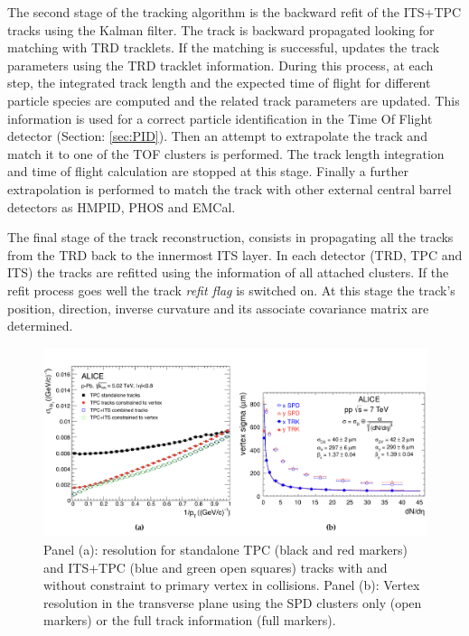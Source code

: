 The second stage of the tracking algorithm is the backward refit of the ITS+TPC tracks using the
Kalman filter.
The track is backward propagated looking for matching with TRD tracklets. If the matching is
successful, updates the track parameters using the TRD tracklet information. 
During this process, at each step, the integrated track length and the expected time of flight
for different particle species are computed and the related track parameters are updated.
This information is used for a correct particle identification in the Time Of Flight detector
(Section: \ref{sec:PID}).
Then an attempt to extrapolate the track and match it to one of the TOF clusters is performed.
The track length integration and time of flight calculation are stopped at this stage.
Finally a further extrapolation is performed to match the track with other external central
barrel detectors as HMPID, PHOS and EMCal.

The final stage of the track reconstruction, consists in propagating all the tracks from the TRD
back to the innermost ITS layer. 
In each detector (TRD, TPC and ITS) the tracks are refitted using the information of all attached
clusters.
If the refit process goes well the track \textit{refit flag} is switched on.
At this stage the track’s position, direction, inverse curvature and its associate covariance 
matrix are determined.

\begin{figure}
    \centering
    \includegraphics[width=\textwidth]{gfx/rec_eff}
	\caption{Panel (a): \pt resolution for standalone TPC (black and red markers) and ITS+TPC (blue and green open squares) tracks with and without constraint to primary vertex in \pPb collisions. Panel (b): Vertex resolution in the transverse plane using the SPD clusters only (open markers) or the full track information (full markers).}
	\label{fig:rec_vert}
\end{figure}

